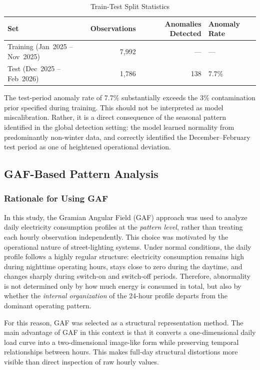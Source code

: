 \documentclass{article}
\begin{document}
\begin{table}[h]
\centering
\caption{Train-Test Split Statistics}
\label{tab:split}
\begin{tabular}{lrrl}
\hline
\textbf{Set} & \textbf{Observations} & \textbf{Anomalies Detected} &
\textbf{Anomaly Rate} \\
\hline
Training (Jan~2025 -- Nov~2025) & 7{,}992 & --- & --- \\
Test     (Dec~2025 -- Feb~2026) & 1{,}786 & 138 & 7.7\% \\
\hline
\end{tabular}
\end{table}

The test-period anomaly rate of 7.7\% substantially exceeds the 3\%
contamination prior specified during training. This should not be
interpreted as model miscalibration. Rather, it is a direct consequence
of the seasonal pattern identified in the global detection setting: the
model learned normality from predominantly non-winter data, and
correctly identified the December--February test period as one of
heightened operational deviation.



\subsection{GAF-Based Pattern Analysis}


\subsubsection{Rationale for Using GAF}

In this study, the Gramian Angular Field (GAF) approach was used to analyze daily electricity consumption profiles at the \emph{pattern level}, rather than treating each hourly observation independently. This choice was motivated by the operational nature of street-lighting systems. Under normal conditions, the daily profile follows a highly regular structure: electricity consumption remains high during nighttime operating hours, stays close to zero during the daytime, and changes sharply during switch-on and switch-off periods. Therefore, abnormality is not determined only by how much energy is consumed in total, but also by whether the \emph{internal organization} of the 24-hour profile departs from the dominant operating pattern.

For this reason, GAF was selected as a structural representation method. The main advantage of GAF in this context is that it converts a one-dimensional daily load curve into a two-dimensional image-like form while preserving temporal relationships between hours. This makes full-day structural distortions more visible than direct inspection of raw hourly values.
\end{document}
